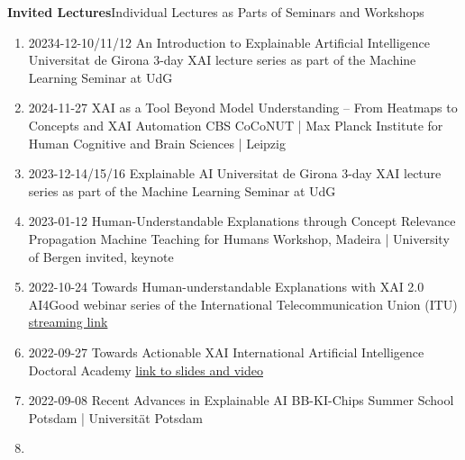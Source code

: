 \headedsection
{\bf Invited Lectures}{Individual Lectures as Parts of Seminars and Workshops}
{
\begin{enumerate}
    \item {}
                    {20234-12-10/11/12}
                    {An Introduction to Explainable Artificial Intelligence}
                    {Universitat de Girona}
                    {3-day XAI lecture series as part of the Machine Learning Seminar at UdG}
    \item {}
                    {2024-11-27}
                    {XAI as a Tool Beyond Model Understanding -- From Heatmaps to Concepts and XAI Automation}
                    {CBS CoCoNUT | Max Planck Institute for Human Cognitive and Brain Sciences | Leipzig}
    \item {}
                    {2023-12-14/15/16}
                    {Explainable AI}
                    {Universitat de Girona}
                    {3-day XAI lecture series as part of the Machine Learning Seminar at UdG}
    \item {}
                    {2023-01-12}
                    {Human-Understandable Explanations through Concept Relevance Propagation}
                    {Machine Teaching for Humans Workshop, Madeira | University of Bergen}
                    {invited, keynote}
    \item {}
                    {2022-10-24}
                    {Towards Human-understandable Explanations with XAI 2.0}
                    {AI4Good webinar series of the International Telecommunication Union (ITU)}
                    {\href{https://www.youtube.com/watch?v=NiE13aBBx28}{streaming link}}
    \item {}
                    {2022-09-27}
                    {Towards Actionable XAI}
                    {International Artificial Intelligence Doctoral Academy}
                    {\href{https://www.i-aida.org/events/towards-actionable-xai-2/}{link to slides and video}}
    \item {}
                    {2022-09-08}
                    {Recent Advances in Explainable AI}
                    {BB-KI-Chips Summer School Potsdam | Universität Potsdam}
    \item {}

\end{enumerate}}
